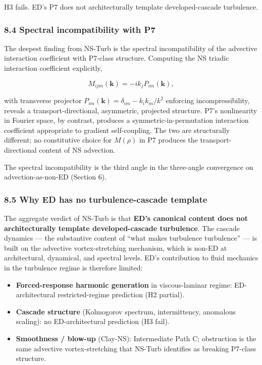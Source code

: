 \documentclass[
]{article}
\providecommand{\tightlist}{%
  \setlength{\itemsep}{0pt}\setlength{\parskip}{0pt}}
\begin{document}
H3 fails. ED's P7 does not architecturally template developed-cascade
turbulence.

\subsubsection{8.4 Spectral incompatibility with
P7}\label{spectral-incompatibility-with-p7}

The deepest finding from NS-Turb is the spectral incompatibility of the
advective interaction coefficient with P7-class structure. Computing the
NS triadic interaction coefficient explicitly,

\[M_{ijm}(\mathbf{k}) = -i k_j P_{im}(\mathbf{k}),\]

with transverse projector
\(P_{im}(\mathbf{k}) = \delta_{im} - k_i k_m/k^2\) enforcing
incompressibility, reveals a transport-directional, asymmetric,
projected structure. P7's nonlinearity in Fourier space, by contrast,
produces a symmetric-in-permutation interaction coefficient appropriate
to gradient self-coupling. The two are structurally different; no
constitutive choice for \(M(\rho)\) in P7 produces the
transport-directional content of NS advection.

The spectral incompatibility is the third angle in the three-angle
convergence on advection-as-non-ED (Section 6).

\subsubsection{8.5 Why ED has no turbulence-cascade
template}\label{why-ed-has-no-turbulence-cascade-template}

The aggregate verdict of NS-Turb is that \textbf{ED's canonical content
does not architecturally template developed-cascade turbulence}. The
cascade dynamics --- the substantive content of ``what makes turbulence
turbulence'' --- is built on the advective vortex-stretching mechanism,
which is non-ED at architectural, dynamical, and spectral levels. ED's
contribution to fluid mechanics in the turbulence regime is therefore
limited:

\begin{itemize}
\tightlist
\item
  \textbf{Forced-response harmonic generation} in viscous-laminar
  regime: ED-architectural restricted-regime prediction (H2 partial).
\item
  \textbf{Cascade structure} (Kolmogorov spectrum, intermittency,
  anomalous scaling): no ED-architectural prediction (H3 fail).
\item
  \textbf{Smoothness / blow-up} (Clay-NS): Intermediate Path C;
  obstruction is the same advective vortex-stretching that NS-Turb
  identifies as breaking P7-class structure.
\end{itemize}
\end{document}
